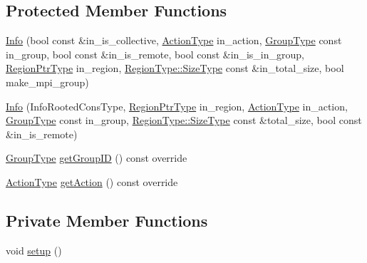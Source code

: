 \subsection*{Protected Member Functions}
\begin{DoxyCompactItemize}
\item 
\hyperlink{structvt_1_1group_1_1_info_ae037ba873e2888a5783ac87eb5f7a33c}{Info} (bool const \&in\+\_\+is\+\_\+collective, \hyperlink{namespacevt_ae0a5a7b18cc99d7b732cb4d44f46b0f3}{Action\+Type} in\+\_\+action, \hyperlink{namespacevt_a27b5e4411c9b6140c49100e050e2f743}{Group\+Type} const in\+\_\+group, bool const \&in\+\_\+is\+\_\+remote, bool const \&in\+\_\+is\+\_\+in\+\_\+group, \hyperlink{structvt_1_1group_1_1_info_rooted_a127ac5ebcfb9871621c1f66dba481c0b}{Region\+Ptr\+Type} in\+\_\+region, \hyperlink{structvt_1_1group_1_1region_1_1_region_a9bb381adf31111aae34dbc644bad6c1f}{Region\+Type\+::\+Size\+Type} const \&in\+\_\+total\+\_\+size, bool make\+\_\+mpi\+\_\+group)
\item 
\hyperlink{structvt_1_1group_1_1_info_a246c74e5238c8fc15d49c258bd25afd5}{Info} (Info\+Rooted\+Cons\+Type, \hyperlink{structvt_1_1group_1_1_info_rooted_a127ac5ebcfb9871621c1f66dba481c0b}{Region\+Ptr\+Type} in\+\_\+region, \hyperlink{namespacevt_ae0a5a7b18cc99d7b732cb4d44f46b0f3}{Action\+Type} in\+\_\+action, \hyperlink{namespacevt_a27b5e4411c9b6140c49100e050e2f743}{Group\+Type} const in\+\_\+group, \hyperlink{structvt_1_1group_1_1region_1_1_region_a9bb381adf31111aae34dbc644bad6c1f}{Region\+Type\+::\+Size\+Type} const \&total\+\_\+size, bool const \&in\+\_\+is\+\_\+remote)
\item 
\hyperlink{namespacevt_a27b5e4411c9b6140c49100e050e2f743}{Group\+Type} \hyperlink{structvt_1_1group_1_1_info_a09fcb16e74a5ae3043859ae70b5b57a9}{get\+Group\+ID} () const override
\item 
\hyperlink{namespacevt_ae0a5a7b18cc99d7b732cb4d44f46b0f3}{Action\+Type} \hyperlink{structvt_1_1group_1_1_info_a399b8266c01f53484469b3b14cdc8640}{get\+Action} () const override
\end{DoxyCompactItemize}
\subsection*{Private Member Functions}
\begin{DoxyCompactItemize}
\item 
void \hyperlink{structvt_1_1group_1_1_info_a34f6c2476f76341f61a17d0b315e2792}{setup} ()
\end{DoxyCompactItemize}
